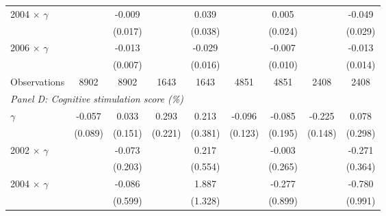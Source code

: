 {\begin{tabular}{l*{8}{c}}
2004 $\times$ $\gamma$&                  &   -0.009         &                  &    0.039         &                  &    0.005         &                  &   -0.049\sym{*}  \\
                &                  &  (0.017)         &                  &  (0.038)         &                  &  (0.024)         &                  &  (0.029)         \\

2006 $\times$ $\gamma$&                  &   -0.013\sym{*}  &                  &   -0.029\sym{*}  &                  &   -0.007         &                  &   -0.013         \\
                &                  &  (0.007)         &                  &  (0.016)         &                  &  (0.010)         &                  &  (0.014)         \\
\midrule
Observations    &     8902         &     8902         &     1643         &     1643         &     4851         &     4851         &     2408         &     2408         \\

\midrule
\multicolumn{9}{l}{\textit{Panel D: Cognitive stimulation score (\%)}} \\
$\gamma$        &   -0.057         &    0.033         &    0.293         &    0.213         &   -0.096         &   -0.085         &   -0.225         &    0.078         \\
                &  (0.089)         &  (0.151)         &  (0.221)         &  (0.381)         &  (0.123)         &  (0.195)         &  (0.148)         &  (0.298)         \\


2002 $\times$ $\gamma$&                  &   -0.073         &                  &    0.217         &                  &   -0.003         &                  &   -0.271         \\
                &                  &  (0.203)         &                  &  (0.554)         &                  &  (0.265)         &                  &  (0.364)         \\

2004 $\times$ $\gamma$&                  &   -0.086         &                  &    1.887         &                  &   -0.277         &                  &   -0.780         \\
                &                  &  (0.599)         &                  &  (1.328)         &                  &  (0.899)         &                  &  (0.991)         \\


\end{tabular}}
